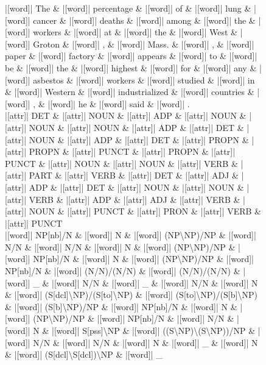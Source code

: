 \documentclass[10pt,a4paper]{article}
\begin{document}
\begin{figure}[h]
{\begin{dependency}[theme = simple]
\begin{deptext}[column sep=1em, row sep=0.1em]
|[word]| The \& |[word]| percentage \& |[word]| of \& |[word]| lung \& |[word]| cancer \& |[word]| deaths \& |[word]| among \& |[word]| the \& |[word]| workers \& |[word]| at \& |[word]| the \& |[word]| West \& |[word]| Groton \& |[word]| , \& |[word]| Mass. \& |[word]| , \& |[word]| paper \& |[word]| factory \& |[word]| appears \& |[word]| to \& |[word]| be \& |[word]| the \& |[word]| highest \& |[word]| for \& |[word]| any \& |[word]| asbestos \& |[word]| workers \& |[word]| studied \& |[word]| in \& |[word]| Western \& |[word]| industrialized \& |[word]| countries \& |[word]| , \& |[word]| he \& |[word]| said \& |[word]| . \\
|[attr]| DET \& |[attr]| NOUN \& |[attr]| ADP \& |[attr]| NOUN \& |[attr]| NOUN \& |[attr]| NOUN \& |[attr]| ADP \& |[attr]| DET \& |[attr]| NOUN \& |[attr]| ADP \& |[attr]| DET \& |[attr]| PROPN \& |[attr]| PROPN \& |[attr]| PUNCT \& |[attr]| PROPN \& |[attr]| PUNCT \& |[attr]| NOUN \& |[attr]| NOUN \& |[attr]| VERB \& |[attr]| PART \& |[attr]| VERB \& |[attr]| DET \& |[attr]| ADJ \& |[attr]| ADP \& |[attr]| DET \& |[attr]| NOUN \& |[attr]| NOUN \& |[attr]| VERB \& |[attr]| ADP \& |[attr]| ADJ \& |[attr]| VERB \& |[attr]| NOUN \& |[attr]| PUNCT \& |[attr]| PRON \& |[attr]| VERB \& |[attr]| PUNCT \\
|[word]| NP{[}nb{]}/N \& |[word]| N \& |[word]| (NP\textbackslash{}NP)/NP \& |[word]| N/N \& |[word]| N/N \& |[word]| N \& |[word]| (NP\textbackslash{}NP)/NP \& |[word]| NP{[}nb{]}/N \& |[word]| N \& |[word]| (NP\textbackslash{}NP)/NP \& |[word]| NP{[}nb{]}/N \& |[word]| (N/N)/(N/N) \& |[word]| (N/N)/(N/N) \& |[word]| \_ \& |[word]| N/N \& |[word]| \_ \& |[word]| N/N \& |[word]| N \& |[word]| (S{[}dcl{]}\textbackslash{}NP)/(S{[}to{]}\textbackslash{}NP) \& |[word]| (S{[}to{]}\textbackslash{}NP)/(S{[}b{]}\textbackslash{}NP) \& |[word]| (S{[}b{]}\textbackslash{}NP)/NP \& |[word]| NP{[}nb{]}/N \& |[word]| N \& |[word]| (NP\textbackslash{}NP)/NP \& |[word]| NP{[}nb{]}/N \& |[word]| N/N \& |[word]| N \& |[word]| S{[}pss{]}\textbackslash{}NP \& |[word]| ((S\textbackslash{}NP)\textbackslash{}(S\textbackslash{}NP))/NP \& |[word]| N/N \& |[word]| N/N \& |[word]| N \& |[word]| \_ \& |[word]| N \& |[word]| (S{[}dcl{]}\textbackslash{}S{[}dcl{]})\textbackslash{}NP \& |[word]| \_ \\
\end{deptext}



\end{dependency}}
\end{figure}
\end{document}
